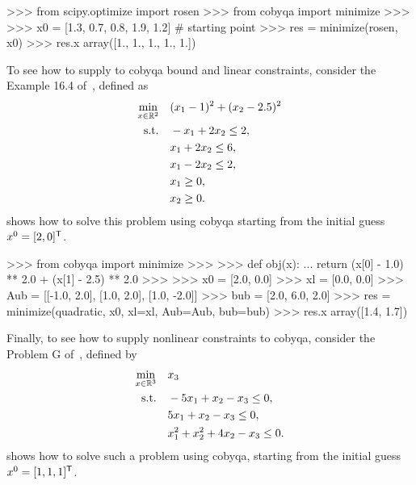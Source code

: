 \begin{lstpython}[%
    caption=Solving the Rosenbrock problem using \gls{cobyqa},
    label=lst:cobyqa-rosenbrock,
]
    >>> from scipy.optimize import rosen
    >>> from cobyqa import minimize
    >>>
    >>> x0 = [1.3, 0.7, 0.8, 1.9, 1.2]  # starting point
    >>> res = minimize(rosen, x0)
    >>> res.x
    array([1., 1., 1., 1., 1.]) 
\end{lstpython}

To see how to supply to \gls{cobyqa} bound and linear constraints, consider the Example 16.4 of~\cite{Nocedal_Wright_2006}, defined as
\begin{align*}
    \min_{\iter \in \R^2}   & \quad (\iter_1 - 1)^2 + (\iter_2 - 2.5)^2\\
    \text{s.t.}             & \quad -\iter_1 + 2 \iter_2 \le 2,\\
                            & \quad \iter_1 + 2 \iter_2 \le 6,\\
                            & \quad \iter_1 - 2 \iter_2 \le 2,\\
                            & \quad \iter_1 \ge 0,\\
                            & \quad \iter_2 \ge 0.
\end{align*}
 shows how to solve this problem using \gls{cobyqa} starting from the initial guess~$\iter[0] = [2, 0]^{\T}$.

\begin{lstpython}[%
    caption=An example of \gls{cobyqa} with linear constraints,
    label=lst:cobyqa-bound-linear,
]
    >>> from cobyqa import minimize
    >>>
    >>> def obj(x):
    ...     return (x[0] - 1.0) ** 2.0 + (x[1] - 2.5) ** 2.0
    >>>
    >>> x0 = [2.0, 0.0]
    >>> xl = [0.0, 0.0]
    >>> Aub = [[-1.0, 2.0], [1.0, 2.0], [1.0, -2.0]]
    >>> bub = [2.0, 6.0, 2.0]
    >>> res = minimize(quadratic, x0, xl=xl, Aub=Aub, bub=bub)
    >>> res.x
    array([1.4, 1.7])
\end{lstpython}

Finally, to see how to supply nonlinear constraints to \gls{cobyqa}, consider the Problem G of~\cite{Powell_1994}, defined by
\begin{align*}
    \min_{\iter \in \R^3}   & \quad \iter_3\\
    \text{s.t.}             & \quad -5 \iter_1 + \iter_2 - \iter_3 \le 0,\\
                            & \quad 5 \iter_1 + \iter_2 - \iter_3 \le 0,\\
                            & \quad \iter_1^2 + \iter_2^2 + 4 \iter_2 - \iter_3 \le 0.
\end{align*}
 shows how to solve such a problem using \gls{cobyqa}, starting from the initial guess~$\iter[0] = [1, 1, 1]^{\T}$.

